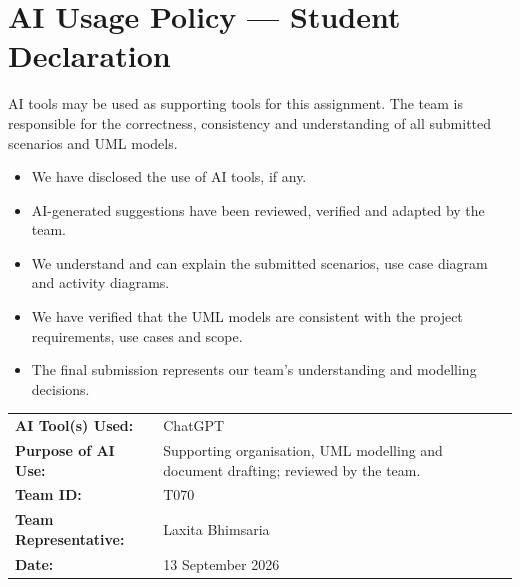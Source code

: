 \documentclass[12pt,a4paper]{article}
\begin{document}
\section*{AI Usage Policy --- Student Declaration}
AI tools may be used as supporting tools for this assignment. The team is responsible for the correctness, consistency and understanding of all submitted scenarios and UML models.
\begin{itemize}[leftmargin=1.4em,itemsep=2pt]
\item We have disclosed the use of AI tools, if any.
\item AI-generated suggestions have been reviewed, verified and adapted by the team.
\item We understand and can explain the submitted scenarios, use case diagram and activity diagrams.
\item We have verified that the UML models are consistent with the project requirements, use cases and scope.
\item The final submission represents our team's understanding and modelling decisions.
\end{itemize}
\begin{tabular}{>{\bfseries}l l}
AI Tool(s) Used: & ChatGPT\\
Purpose of AI Use: & Supporting organisation, UML modelling and document drafting; reviewed by the team.\\
Team ID: & T070\\
Team Representative: & Laxita Bhimsaria\\
Date: & 13 September 2026
\end{tabular}
\end{document}
